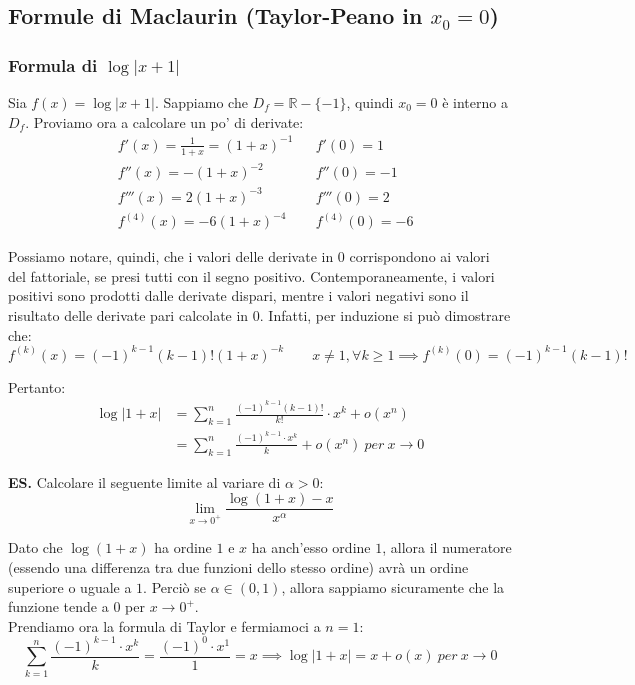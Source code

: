\documentclass{article}
\begin{document}
\subsection{Formule di Maclaurin (Taylor-Peano in $x_0 = 0$)}
\subsubsection{Formula di $\log|x + 1|$}
Sia $f(x) = \log|x + 1|$. Sappiamo che $D_f = \mathbb{R} - \{-1\}$, quindi $x_0 = 0$ è interno a $D_f$. Proviamo ora a calcolare un po' di derivate:
\begin{align*}
    & f'(x) = \frac{1}{1 + x} = (1 + x)^{-1} && f'(0) = 1 \\
    & f''(x) = -(1 + x)^{-2} && f''(0) = -1 \\
    & f'''(x) = 2(1 + x)^{-3} && f'''(0) = 2 \\
    & f^{(4)}(x) = -6(1 + x)^{-4} && f^{(4)}(0) = -6
\end{align*}

\noindent Possiamo notare, quindi, che i valori delle derivate in $0$ corrispondono ai valori del fattoriale, se presi tutti con il segno positivo. Contemporaneamente, i valori positivi sono prodotti dalle derivate dispari, mentre i valori negativi sono il risultato delle derivate pari calcolate in $0$. Infatti, per induzione si può dimostrare che:
\begin{equation*}
    f^{(k)}(x) = (-1)^{k - 1}(k - 1)!(1 + x)^{-k} \qquad x \neq 1, \forall k \geq 1 \implies f^{(k)}(0) = (-1)^{k - 1}(k - 1)!
\end{equation*}

\noindent Pertanto:
\begin{align*}
    \log|1 + x| &= \sum_{k = 1}^n \frac{(-1)^{k - 1}(k - 1)!}{k!} \cdot x^k + o(x^n) \\
    &= \sum_{k = 1}^n \frac{(-1)^{k - 1} \cdot x^k}{k} + o(x^n) \ per \ x \to 0
\end{align*}

\noindent\textbf{ES.} Calcolare il seguente limite al variare di $\alpha > 0$:
\begin{equation*}
    \lim_{x \to 0^+} \frac{\log(1 + x) - x}{x^\alpha}
\end{equation*}

\noindent Dato che $\log(1 + x)$ ha ordine $1$ e $x$ ha anch'esso ordine $1$, allora il numeratore (essendo una differenza tra due funzioni dello stesso ordine) avrà un ordine superiore o uguale a $1$. Perciò se $\alpha \in (0, 1)$, allora sappiamo sicuramente che la funzione tende a $0$ per $x \to 0^+$. \\
Prendiamo ora la formula di Taylor e fermiamoci a $n = 1$:
\begin{equation*}
    \sum_{k = 1}^n \frac{(-1)^{k - 1} \cdot x^k}{k} = \frac{(-1)^0 \cdot x^1}{1} = x \implies \log|1 + x| = x + o(x) \ per \ x \to 0
\end{equation*}
\end{document}
